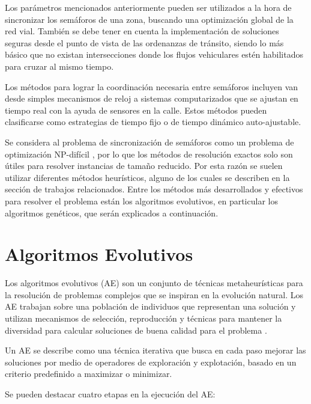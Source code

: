 Los parámetros mencionados anteriormente pueden ser utilizados a la hora de sincronizar los semáforos de una zona, buscando una optimización global de la red vial. También se debe tener en cuenta la implementación de soluciones seguras desde el punto de vista de las ordenanzas de tránsito, siendo lo más básico que no existan intersecciones donde los flujos vehiculares estén habilitados para cruzar al mismo tiempo.

Los métodos para lograr la coordinación necesaria entre semáforos incluyen van desde simples mecanismos de reloj a sistemas computarizados que se ajustan en tiempo real con la ayuda de sensores en la calle. Estos métodos pueden clasificarse como estrategias de tiempo fijo o de tiempo dinámico auto-ajustable.

Se considera al problema de sincronización de semáforos como un problema de optimización NP-difícil \citep{yang1996model}, por lo que los métodos de resolución exactos solo son útiles para resolver instancias de tamaño reducido. Por esta razón se suelen utilizar diferentes métodos heurísticos, alguno de los cuales se describen en la sección de trabajos relacionados. Entre los métodos más desarrollados y efectivos para resolver el problema están los algoritmos evolutivos, en particular los algoritmos genéticos, que serán explicados a continuación.

\section{Algoritmos Evolutivos}

Los algoritmos evolutivos (AE) son un conjunto de técnicas metaheurísticas para la resolución de problemas complejos que se inspiran en la evolución natural. Los AE trabajan sobre una población de individuos que representan una solución y utilizan mecanismos de selección, reproducción y técnicas para mantener la diversidad para calcular soluciones de buena calidad para el problema \citep{spears2000evolutionary}. 

Un AE se describe como una técnica iterativa que busca en cada paso mejorar las soluciones por medio de operadores de exploración y explotación, basado en un criterio predefinido a maximizar o minimizar.

Se pueden destacar cuatro etapas en la ejecución del AE:

